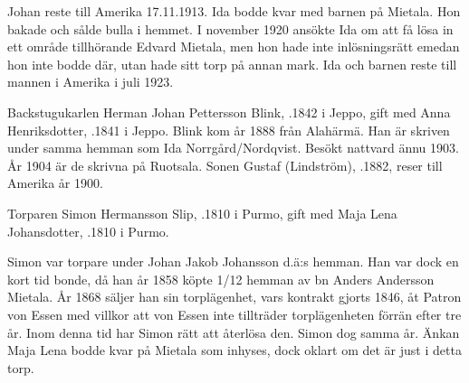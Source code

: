 Johan reste till Amerika 17.11.1913. Ida bodde kvar med barnen på Mietala. Hon bakade och sålde bulla i hemmet. I november 1920 ansökte Ida om att få lösa in ett område tillhörande Edvard Mietala, men hon hade inte inlösningsrätt emedan hon inte bodde där, utan hade sitt torp på annan mark. Ida och barnen reste till mannen i Amerika i juli 1923.


%
Backstugukarlen Herman Johan Pettersson Blink, .1842 i Jeppo, gift med Anna Henriksdotter, .1841 i Jeppo. Blink kom år 1888 från Alahärmä. Han är skriven under samma hemman som Ida Norrgård/Nordqvist. Besökt nattvard ännu 1903. År 1904 är de skrivna på Ruotsala. Sonen Gustaf (Lindström), .1882, reser till Amerika år 1900.


%
Torparen Simon Hermansson Slip, .1810 i Purmo, gift med Maja Lena Johansdotter, .1810 i Purmo.
\begin{jhchildren}
  \item {}
  \item {}
  \item {}
  \item {}
  \item {}
  \item {}
\end{jhchildren}

Simon var torpare under Johan Jakob Johansson d.ä:s hemman. Han var dock en kort tid bonde, då han år 1858 köpte 1/12 hemman av bn Anders Andersson Mietala. År 1868 säljer han sin torplägenhet, vars kontrakt gjorts 1846, åt Patron von Essen med villkor att von Essen inte tillträder torplägenheten förrän efter tre år. Inom denna tid har Simon rätt att återlösa den. Simon dog samma år. Änkan Maja Lena bodde kvar på Mietala som inhyses, dock oklart om det är just i detta torp.


